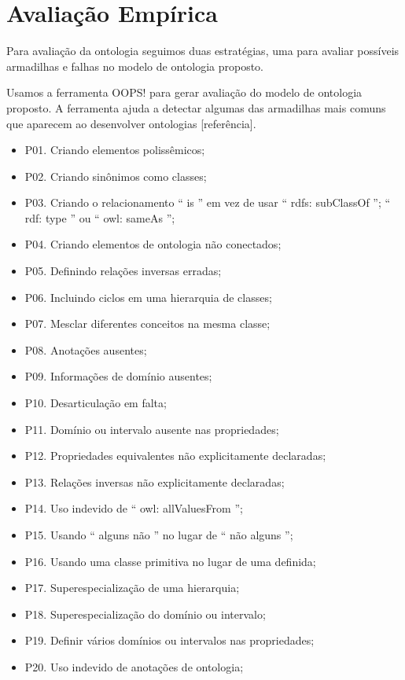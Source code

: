 \section{Avaliação Empírica}
\label{sec:avaliacao}

Para avaliação da ontologia seguimos duas estratégias, uma para avaliar possíveis armadilhas e falhas no modelo de ontologia proposto.

Usamos a ferramenta OOPS! para gerar avaliação do modelo de ontologia proposto. A ferramenta ajuda a detectar algumas das armadilhas mais comuns que aparecem ao desenvolver ontologias [referência].

\begin{itemize}
	\item P01. Criando elementos polissêmicos;
	\item P02. Criando sinônimos como classes;
	\item P03. Criando o relacionamento `` is '' em vez de usar `` rdfs: subClassOf ''; `` rdf: type '' ou `` owl: sameAs '';
	\item P04. Criando elementos de ontologia não conectados;
	\item P05. Definindo relações inversas erradas;
	\item P06. Incluindo ciclos em uma hierarquia de classes;
	\item P07. Mesclar diferentes conceitos na mesma classe;
	\item P08. Anotações ausentes;
	\item P09. Informações de domínio ausentes;
	\item P10. Desarticulação em falta;
	\item P11. Domínio ou intervalo ausente nas propriedades;
	\item P12. Propriedades equivalentes não explicitamente declaradas;
	\item P13. Relações inversas não explicitamente declaradas;
	\item P14. Uso indevido de `` owl: allValuesFrom '';
	\item P15. Usando `` alguns não '' no lugar de `` não alguns '';
	\item P16. Usando uma classe primitiva no lugar de uma definida;
	\item P17. Superespecialização de uma hierarquia;
	\item P18. Superespecialização do domínio ou intervalo;
	\item P19. Definir vários domínios ou intervalos nas propriedades;
	\item P20. Uso indevido de anotações de ontologia;

\end{itemize}
